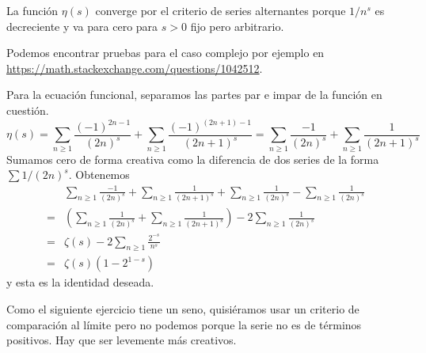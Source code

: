 \documentclass[12pt]{memoir}
\begin{document}
\begin{Ej}
    La función \(\eta(s)\) converge por el criterio de series alternantes porque \(1/n^s\) es decreciente y va para cero para \(s>0\) fijo pero arbitrario.\par
    Podemos encontrar pruebas para el caso complejo por ejemplo en \url{https://math.stackexchange.com/questions/1042512}.\par
    Para la ecuación funcional, separamos las partes par e impar de la función en cuestión.
    \[
    \eta(s)=\sum_{n\geq 1}\frac{(-1)^{2n-1}}{(2n)^s}+\sum_{n\geq 1}\frac{(-1)^{(2n+1)-1}}{(2n+1)^s}=\sum_{n\geq 1}\frac{-1}{(2n)^s}+\sum_{n\geq 1}\frac{1}{(2n+1)^s}
    \]
    Sumamos cero de forma creativa como la diferencia de dos series de la forma \(\sum 1/(2n)^s\). Obtenemos 
    \begin{align*}
        &\sum_{n\geq 1}\frac{-1}{(2n)^s}+\sum_{n\geq 1}\frac{1}{(2n+1)^s}+\sum_{n\geq 1}\frac{1}{(2n)^s}-\sum_{n\geq 1}\frac{1}{(2n)^s}\\
        =&\left(\sum_{n\geq 1}\frac{1}{(2n)^s}+\sum_{n\geq 1}\frac{1}{(2n+1)^s}\right)-2\sum_{n\geq 1}\frac{1}{(2n)^s}\\
        =&\zeta(s)-2\sum_{n\geq 1}\frac{2^{-s}}{n^s}\\
        =&\zeta(s)(1-2^{1-s})
    \end{align*}
    y esta es la identidad deseada.
\end{Ej}

Como el siguiente ejercicio tiene un seno, quisiéramos usar un criterio de comparación al límite pero no podemos porque la serie no es de términos positivos. Hay que ser levemente más creativos.
\end{document}
